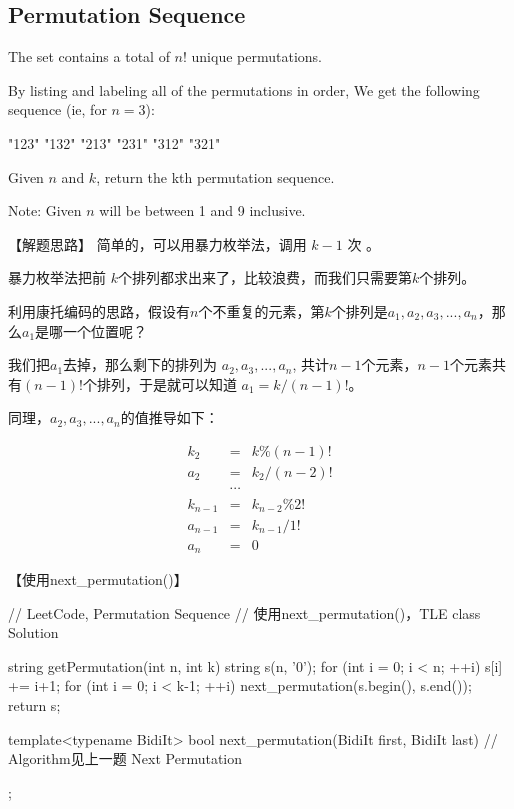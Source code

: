 \subsection{Permutation Sequence} %
\label{sec:permutation-sequence}



The set \fn{[1,2,3,…,n]} contains a total of $n!$ unique permutations.

By listing and labeling all of the permutations in order,
We get the following sequence (ie, for $n = 3$):
\begin{Code}
	"123"
	"132"
	"213"
	"231"
	"312"
	"321"
\end{Code}

Given $n$ and $k$, return the kth permutation sequence.

Note: Given $n$ will be between 1 and 9 inclusive.


【解题思路】
简单的，可以用暴力枚举法，调用 $k-1$ 次 。

暴力枚举法把前 $k$个排列都求出来了，比较浪费，而我们只需要第$k$个排列。

利用康托编码的思路，假设有$n$个不重复的元素，第$k$个排列是$a_1, a_2, a_3, ...,
a_n$，那么$a_1$是哪一个位置呢？

我们把$a_1$去掉，那么剩下的排列为
$a_2, a_3, ..., a_n$, 共计$n-1$个元素，$n-1$个元素共有$(n-1)!$个排列，于是就可以知道
$a_1 = k / (n-1)!$。

同理，$a_2, a_3, ..., a_n$的值推导如下：

\begin{eqnarray}
	k_2 &=& k\%(n-1)! \nonumber \\
	a_2 &=& k_2/(n-2)! \nonumber \\
	\quad & \cdots \nonumber \\
	k_{n-1} &=& k_{n-2}\%2! \nonumber \\
	a_{n-1} &=& k_{n-1}/1! \nonumber \\
	a_n &=& 0 \nonumber
\end{eqnarray}


【使用next_permutation()】
\begin{Code}
	// LeetCode, Permutation Sequence
	// 使用next_permutation()，TLE
	class Solution {
		string getPermutation(int n, int k) {
			string s(n, '0');
			for (int i = 0; i < n; ++i)
				s[i] += i+1;
			for (int i = 0; i < k-1; ++i)
				next_permutation(s.begin(), s.end());
			return s;
		}
		
		template<typename BidiIt>
		bool next_permutation(BidiIt first, BidiIt last) {
			// Algorithm见上一题 Next Permutation
		}
	};
\end{Code}


